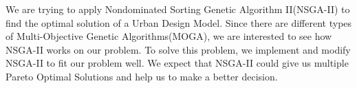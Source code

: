 \iffalse
In your thesis document, you should have a good abstract that can answer the following questions: (1) What is the problem you worked on, (2) Why is it interesting or motivation for working on this problem, (3) How did you achieve the solution or What did you do?, and (4) How well did your idea work out?
\fi

We are trying to apply Nondominated Sorting Genetic Algorithm II(NSGA-II) to find the optimal solution of a Urban Design Model. Since there are different types of Multi-Objective Genetic Algorithms(MOGA), we are interested to see how NSGA-II works on our problem. To solve this problem, we implement and modify NSGA-II to fit our problem well. We expect that NSGA-II could give us multiple Pareto Optimal Solutions and help us to make a better decision.
